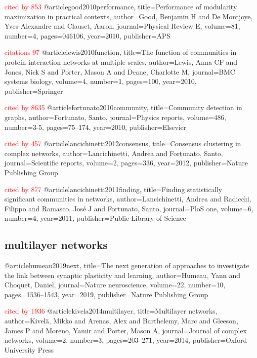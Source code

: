 \textcolor{red}{cited by 853}
@article{good2010performance,
  title={Performance of modularity maximization in practical contexts},
  author={Good, Benjamin H and De Montjoye, Yves-Alexandre and Clauset, Aaron},
  journal={Physical Review E},
  volume={81},
  number={4},
  pages={046106},
  year={2010},
  publisher={APS}
}

\textcolor{red}{citations 97}
@article{lewis2010function,
  title={The function of communities in protein interaction networks at multiple scales},
  author={Lewis, Anna CF and Jones, Nick S and Porter, Mason A and Deane, Charlotte M},
  journal={BMC systems biology},
  volume={4},
  number={1},
  pages={100},
  year={2010},
  publisher={Springer}
}

\textcolor{red}{cited by 8635}
@article{fortunato2010community,
  title={Community detection in graphs},
  author={Fortunato, Santo},
  journal={Physics reports},
  volume={486},
  number={3-5},
  pages={75--174},
  year={2010},
  publisher={Elsevier}
}

\textcolor{red}{cited by 457}
@article{lancichinetti2012consensus,
  title={Consensus clustering in complex networks},
  author={Lancichinetti, Andrea and Fortunato, Santo},
  journal={Scientific reports},
  volume={2},
  pages={336},
  year={2012},
  publisher={Nature Publishing Group}
}

\textcolor{red}{cited by 877}
@article{lancichinetti2011finding,
  title={Finding statistically significant communities in networks},
  author={Lancichinetti, Andrea and Radicchi, Filippo and Ramasco, Jos{\'e} J and Fortunato, Santo},
  journal={PloS one},
  volume={6},
  number={4},
  year={2011},
  publisher={Public Library of Science}
}

\subsection{multilayer networks}@article{humeau2019next,
  title={The next generation of approaches to investigate the link between synaptic plasticity and learning},
  author={Humeau, Yann and Choquet, Daniel},
  journal={Nature neuroscience},
  volume={22},
  number={10},
  pages={1536--1543},
  year={2019},
  publisher={Nature Publishing Group}
}

\textcolor{red}{cited by 1936}
@article{kivela2014multilayer,
  title={Multilayer networks},
  author={Kivel{\"a}, Mikko and Arenas, Alex and Barthelemy, Marc and Gleeson, James P and Moreno, Yamir and Porter, Mason A},
  journal={Journal of complex networks},
  volume={2},
  number={3},
  pages={203--271},
  year={2014},
  publisher={Oxford University Press}
}

